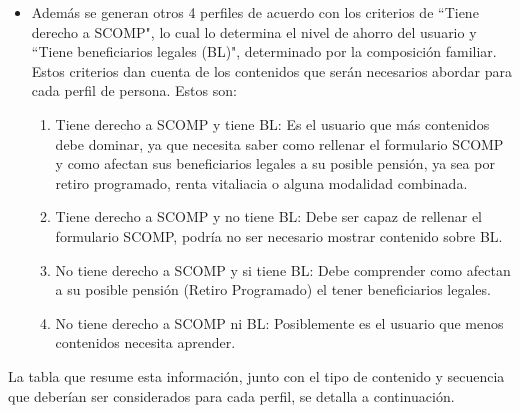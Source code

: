 \begin{itemize}
    \item Además se generan otros 4 perfiles de acuerdo con los criterios de ``Tiene derecho a SCOMP", lo cual lo determina el nivel de ahorro del usuario y ``Tiene beneficiarios legales (BL)", determinado por la composición familiar. Estos criterios dan cuenta de los contenidos que serán necesarios abordar para cada perfil de persona. Estos son: 
    \begin{enumerate}
        \item Tiene derecho a SCOMP y tiene BL: Es el usuario que más contenidos debe dominar, ya que necesita saber como rellenar el formulario SCOMP y como afectan sus beneficiarios legales a su posible pensión, ya sea por retiro programado, renta vitaliacia o alguna modalidad combinada.   
        \item Tiene derecho a SCOMP y no tiene BL: Debe ser capaz de rellenar el formulario SCOMP, podría no ser necesario mostrar contenido sobre BL.  
        \item No tiene derecho a SCOMP y si tiene BL: Debe comprender como afectan a su posible pensión (Retiro Programado) el tener beneficiarios legales. 
        \item No tiene derecho a SCOMP ni BL: Posiblemente es el usuario que menos contenidos necesita aprender. 
    \end{enumerate}
    
\end{itemize}

La tabla que resume esta información, junto con el tipo de contenido y secuencia que deberían ser considerados para cada perfil, se detalla a continuación. 

